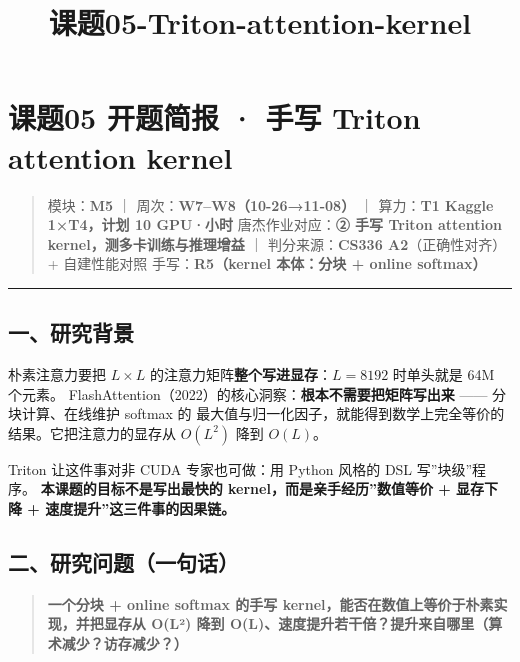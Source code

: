 \documentclass[
  chinese,
  11pt,
]{ctexart}
\title{课题05-Triton-attention-kernel}
\author{}
\date{}
\begin{document}
\maketitle

{
\setcounter{tocdepth}{2}
\tableofcontents
}
\section{课题05 开题简报 · 手写 Triton attention kernel}\label{ux8bfeux989805-ux5f00ux9898ux7b80ux62a5-ux624bux5199-triton-attention-kernel}

\begin{quote}
模块：\textbf{M5} ｜ 周次：\textbf{W7--W8（10-26→11-08）} ｜ 算力：\textbf{T1 Kaggle 1×T4，计划 10 GPU·小时} 唐杰作业对应：\textbf{② 手写 Triton attention kernel，测多卡训练与推理增益} ｜ 判分来源：\textbf{CS336 A2}（正确性对齐）+ 自建性能对照 手写：\textbf{R5（kernel 本体：分块 + online softmax）}
\end{quote}

\begin{center}\rule{0.5\linewidth}{0.5pt}\end{center}

\subsection{一、研究背景}\label{ux4e00ux7814ux7a76ux80ccux666f}

朴素注意力要把 \(L\times L\) 的注意力矩阵\textbf{整个写进显存}：\(L=8192\) 时单头就是 64M 个元素。 FlashAttention（2022）的核心洞察：\textbf{根本不需要把矩阵写出来} ------ 分块计算、在线维护 softmax 的 最大值与归一化因子，就能得到数学上完全等价的结果。它把注意力的显存从 \(O(L^2)\) 降到 \(O(L)\)。

Triton 让这件事对非 CUDA 专家也可做：用 Python 风格的 DSL 写''块级''程序。 \textbf{本课题的目标不是写出最快的 kernel，而是亲手经历''数值等价 + 显存下降 + 速度提升''这三件事的因果链。}

\subsection{二、研究问题（一句话）}\label{ux4e8cux7814ux7a76ux95eeux9898ux4e00ux53e5ux8bdd}

\begin{quote}
\textbf{一个分块 + online softmax 的手写 kernel，能否在数值上等价于朴素实现，并把显存从 O(L²) 降到 O(L)、速度提升若干倍？提升来自哪里（算术减少？访存减少？）}
\end{quote}
\end{document}
